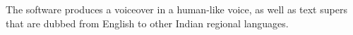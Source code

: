 \documentclass[preview]{standalone}
\begin{document}
\begin{flushleft}
\fontsize{15}{0}\selectfont The software produces a voiceover in a human-like voice, as well as text supers that are dubbed from English to other Indian regional languages.
\end{flushleft}
\end{document}

